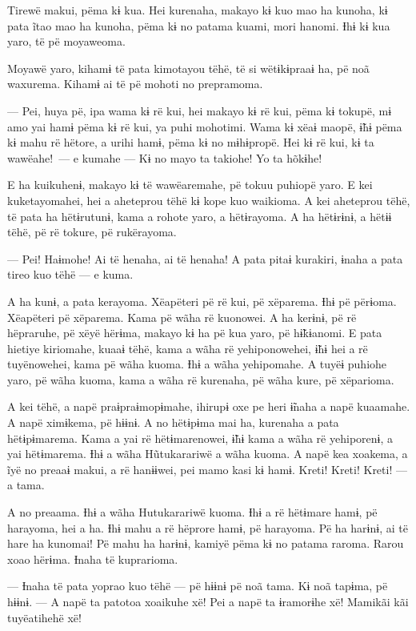 Tirewë makui, pëma kɨ kua. Hei kurenaha, makayo kɨ kuo mao ha kunoha, kɨ
pata ĩtao mao ha kunoha, pëma kɨ no patama kuami, mori hanomi. Ɨhɨ kɨ
kua yaro, të pë moyaweoma.

Moyawë yaro, kihamɨ të pata kimotayou tëhë, të si wëtɨkɨpraaɨ ha, pë noã
waxurema. Kihamɨ ai të pë mohoti no prepramoma.

--- Pei, huya pë, ipa wama kɨ rë kui, hei makayo kɨ rë kui, pëma kɨ
tokupë, mɨ amo yai hamɨ pëma kɨ rë kui, ya puhi mohotimi. Wama kɨ xëaɨ
maopë, ɨ̃hɨ pëma kɨ mahu rë hëtore, a urihi hamɨ, pëma kɨ no mɨhɨpropë.
Hei kɨ rë kui, kɨ ta wawëahe!~--- e kumahe --- Kɨ no mayo ta takiohe! Yo
ta hõkɨhe!

E ha kuikuhenɨ, makayo kɨ të wawëaremahe, pë tokuu puhiopë yaro. E kei
kuketayomahei, hei a aheteprou tëhë kɨ kope kuo waikioma. A kei
aheteprou tëhë, të pata ha hëtɨrutunɨ, kama a rohote yaro, a hëtɨrayoma.
A ha hëtɨrɨnɨ, a hëtɨɨ tëhë, pë rë tokure, pë rukërayoma.

--- Pei! Haɨmohe! Ai të henaha, ai të henaha! A pata pitaɨ kurakiri,
ɨnaha a pata tireo kuo tëhë --- e kuma.

A ha kunɨ, a pata kerayoma. Xëapëteri pë rë kui, pë xëparema. Ɨhɨ pë
përɨoma. Xëapëteri pë xëparema. Kama pë wãha rë kuonowei. A ha kerɨnɨ,
pë rë hëpraruhe, pë xëyë hërɨma, makayo kɨ ha pë kua yaro, pë hɨ̃kɨanomi.
E pata hietiye kiriomahe, kuaaɨ tëhë, kama a wãha rë yehiponowehei, ɨ̃hɨ
hei a rë tuyënowehei, kama pë wãha kuoma. Ɨhɨ a wãha yehipomahe. A tuyëɨ
puhiohe yaro, pë wãha kuoma, kama a wãha rë kurenaha, pë wãha kure, pë
xëparioma.

A kei tëhë, a napë praɨpraɨmopɨmahe, ihirupɨ oxe pe heri ɨ̃naha a napë
kuaamahe. A napë ximɨkema, pë hɨɨnɨ. A no hëtɨpɨma mai ha, kurenaha a
pata hëtɨpɨmarema. Kama a yai rë hëtɨmarenowei, ɨ̃hɨ kama a wãha rë
yehiporenɨ, a yai hëtɨmarema. Ɨhɨ a wãha Hũtukarariwë a wãha kuoma. A napë kea xoakema, a ĩyë no preaaɨ makui, a rë hanɨɨwei, pei mamo kasi kɨ
hamɨ. Kreti! Kreti! Kreti! --- a tama.

A no preaama. Ɨhɨ a wãha Hutukarariwë kuoma. Ɨhɨ a rë hëtɨmare hamɨ, pë
harayoma, hei a ha. Ɨhɨ mahu a rë hëprore hamɨ, pë harayoma. Pë ha
harɨnɨ, ai të hare ha kunomai! Pë mahu ha harɨnɨ, kamiyë pëma kɨ no
patama raroma. Rarou xoao hërɨma. Ɨnaha të kuprarioma. 

--- Ɨnaha të pata yoprao kuo tëhë --- pë hɨɨnɨ pë noã tama. Kɨ noã
tapɨma, pë hɨɨnɨ. --- A napë ta patotoa xoaikuhe xë! Pei a napë ta
ɨramorɨhe xë! Mamikãi kãi tuyëatihehë xë!


